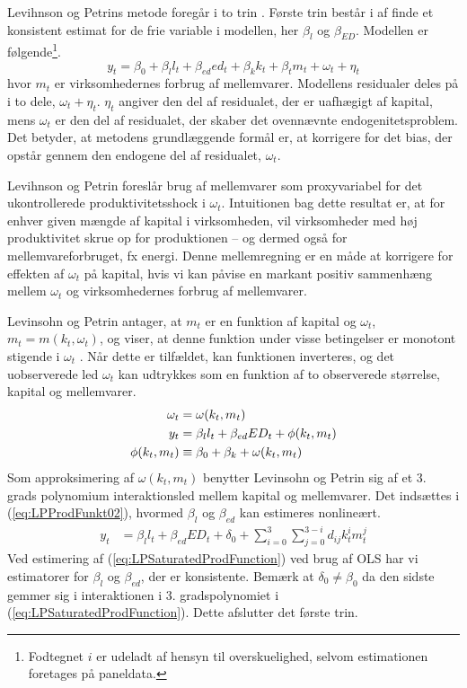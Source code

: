 Levihnson og Petrins metode foregår i to trin \cite[p. 115ff.]{petrin2004production}. Første trin består i af finde et konsistent estimat for de frie variable i modellen, her $\beta_l$ og $\beta_{ED}$. Modellen er følgende\footnote{Fodtegnet $i$ er udeladt af hensyn til overskuelighed, selvom estimationen foretages på paneldata.}.
\begin{equation}
	y_{t} = \beta_0 + \beta_l l_t+ \beta_{ed} ed_t +
	\beta_k k_t + \beta_t m_t + \omega_t + \eta_t
	\label{LP_01}
\end{equation}
hvor $m_t$ er virksomhedernes forbrug af mellemvarer. Modellens residualer deles på i to dele, $\omega_t + \eta_t$. $\eta_t$ angiver den del af residualet, der er uafhægigt af kapital, mens $\omega_t$ er den del af residualet, der skaber det ovennævnte endogenitetsproblem. Det betyder, at metodens grundlæggende formål er, at korrigere for det bias, der opstår gennem den endogene del af residualet, 
$\omega_t$.

Levihnson og Petrin foreslår brug af mellemvarer som proxyvariabel for det ukontrollerede produktivitetsshock i $\omega_t$. Intuitionen bag dette resultat er, at for enhver given mængde af kapital i virksomheden, vil virksomheder med høj produktivitet skrue op for produktionen -- og dermed også for mellemvareforbruget, fx energi. Denne mellemregning er en måde at korrigere for effekten af $\omega_t$ på kapital, hvis vi kan påvise en markant positiv sammenhæng mellem $\omega_t$ og virksomhedernes forbrug af mellemvarer.

Levinsohn og Petrin antager, at $m_t$ er en funktion af kapital og $\omega_t$, $m_t = m(k_t , \omega_t)$, og viser, at denne funktion under visse betingelser er monotont stigende i $\omega_t$ \cite[322-323]{levinsohn2003estimating}. Når dette er tilfældet, kan funktionen inverteres, og det uobserverede led $\omega_t$ kan udtrykkes som en funktion af to observerede størrelse, kapital og mellemvarer.
\begin{align}
	\omega_t &= \omega(k_t , m_t)
	\label{eq:InverseOmega} \\
	y_t &= \beta_l l_t + \beta_{ed} ED_t + \phi ( k_t , m_t)
	\label{eq:LPProdFunkt02}\\
	\phi ( k_t , m_t) &\equiv \beta_0 + \beta_k + \omega (k_t , m_t) \notag
\end{align}
Som approksimering af $\omega ( k_t , m_t)$ benytter Levinsohn og Petrin sig af et 3. grads polynomium interaktionsled mellem kapital og mellemvarer. Det indsættes i (\ref{eq:LPProdFunkt02}), hvormed $\beta_l$ og $\beta_{ed}$ kan estimeres nonlineært.
\begin{align}
	y_t &= \beta_l l_t + \beta_{ed} ED_t + \delta_0 + \sum_{i=0}^{3} \sum_{j=0}^{3-i} d_{ij} k_t^i m_t^j 
	\label{eq:LPSaturatedProdFunction}
\end{align}
Ved estimering af (\ref{eq:LPSaturatedProdFunction}) ved brug af OLS har vi estimatorer for $\beta_l$ og $\beta_{ed}$, der er konsistente. Bemærk at $\delta_0 \neq \beta_0$ da den sidste gemmer sig i interaktionen i 3. gradspolynomiet i (\ref{eq:LPSaturatedProdFunction}). Dette afslutter det første trin.

